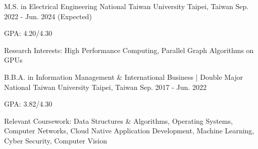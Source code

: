 

\begin{cventries}

  \cventry
    {M.S. in Electrical Engineering} %
    {National Taiwan University} %
    {Taipei, Taiwan} %
    {Sep. 2022 - Jun. 2024 (Expected)} %
    {
      \begin{cvitems} %
        \item {GPA: 4.20/4.30}
        \item {Research Interests: High Performance Computing, Parallel Graph Algorithms on GPUs}
      \end{cvitems}
    }

  \cventry
    {B.B.A. in Information Management \& International Business | Double Major} %
    {National Taiwan University} %
    {Taipei, Taiwan} %
    {Sep. 2017 - Jun. 2022} %
    {
      \begin{cvitems}
        \item GPA: 3.82/4.30
        \item {Relevant Coursework: Data Structures \& Algorithms, Operating Systems, Computer Networks, Cloud Native Application Development, Machine Learning, Cyber Security, Computer Vision}
      \end{cvitems}
    }
\end{cventries}
